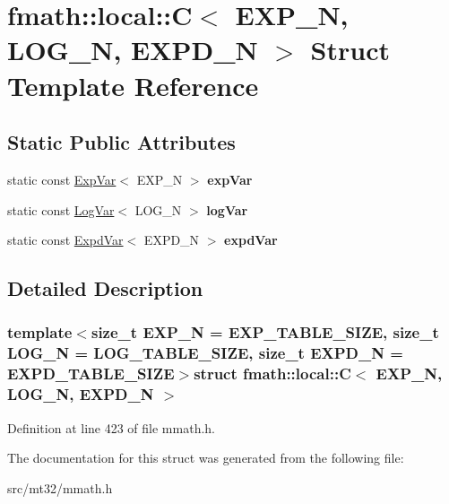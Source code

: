 \hypertarget{structfmath_1_1local_1_1C}{\section{fmath\-:\-:local\-:\-:C$<$ E\-X\-P\-\_\-\-N, L\-O\-G\-\_\-\-N, E\-X\-P\-D\-\_\-\-N $>$ Struct Template Reference}
\label{structfmath_1_1local_1_1C}
}
\subsection*{Static Public Attributes}
\begin{DoxyCompactItemize}
\item 
\hypertarget{structfmath_1_1local_1_1C_ad9a9c8958d9238f7185120e897cffd7e}{static const \hyperlink{structfmath_1_1local_1_1ExpVar}{Exp\-Var}$<$ E\-X\-P\-\_\-\-N $>$ {\bfseries exp\-Var}}\label{structfmath_1_1local_1_1C_ad9a9c8958d9238f7185120e897cffd7e}

\item 
\hypertarget{structfmath_1_1local_1_1C_a6ed90bdf46a6283346b0759638e37e79}{static const \hyperlink{structfmath_1_1local_1_1LogVar}{Log\-Var}$<$ L\-O\-G\-\_\-\-N $>$ {\bfseries log\-Var}}\label{structfmath_1_1local_1_1C_a6ed90bdf46a6283346b0759638e37e79}

\item 
\hypertarget{structfmath_1_1local_1_1C_a12cfecf7377b29bb5e9d11eb9d1cd974}{static const \hyperlink{structfmath_1_1local_1_1ExpdVar}{Expd\-Var}$<$ E\-X\-P\-D\-\_\-\-N $>$ {\bfseries expd\-Var}}\label{structfmath_1_1local_1_1C_a12cfecf7377b29bb5e9d11eb9d1cd974}

\end{DoxyCompactItemize}


\subsection{Detailed Description}
\subsubsection*{template$<$size\-\_\-t E\-X\-P\-\_\-\-N = E\-X\-P\-\_\-\-T\-A\-B\-L\-E\-\_\-\-S\-I\-Z\-E, size\-\_\-t L\-O\-G\-\_\-\-N = L\-O\-G\-\_\-\-T\-A\-B\-L\-E\-\_\-\-S\-I\-Z\-E, size\-\_\-t E\-X\-P\-D\-\_\-\-N = E\-X\-P\-D\-\_\-\-T\-A\-B\-L\-E\-\_\-\-S\-I\-Z\-E$>$struct fmath\-::local\-::\-C$<$ E\-X\-P\-\_\-\-N, L\-O\-G\-\_\-\-N, E\-X\-P\-D\-\_\-\-N $>$}



Definition at line 423 of file mmath.\-h.



The documentation for this struct was generated from the following file\-:\begin{DoxyCompactItemize}
\item 
src/mt32/mmath.\-h\end{DoxyCompactItemize}
